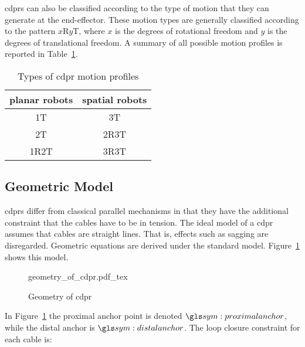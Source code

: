 		\glspl{cdpr} can also be classified according to the type of motion that
		they can generate at the end-effector.	These motion types are generally
		classified according to the pattern $x$R$y$T, where $x$ is	the  degrees
        of rotational freedom and $y$ is the degrees of translational freedom. A
		summary   of   all	 possible	motion	 profiles	is	  reported	  in
        Table~\ref{tab:types_of_cdpr_motion_profiles}.

        \begin{table}[ht]
            \centering
            \begin{tabular}{c c}
                \toprule
                planar robots & spatial robots \\
                \midrule
                1T          &   3T \\
                2T          &   2R3T \\
                1R2T        &   3R3T
            \end{tabular}
            \caption{Types of \gls{cdpr} motion profiles}%
            \label{tab:types_of_cdpr_motion_profiles}
        \end{table}

    \subsection{Geometric Model}%
    \label{sec:geometric_model}

		\glspl{cdpr} differ from classical parallel mechanisms in that they have
		the additional constraint that the cables have to be  in  tension.	 The
        ideal model of a \gls{cdpr} assumes that cables are straight lines. That
		is, effects such as sagging are disregarded.   Geometric  equations  are
		derived under  the	standard  model.   Figure~\ref{fig:geometry_of_cdpr}
        shows this model.  

        \begin{figure}[hb]
			\centering
			\def\svgwidth{\columnwidth}
			{geometry_of_cdpr.pdf_tex}
            \caption{Geometry of \gls{cdpr}}%
            \label{fig:geometry_of_cdpr}
        \end{figure}

		In	Figure~\ref{fig:geometry_of_cdpr}  the	proximal  anchor  point   is
		denoted $\proximalanchor$, while the distal anchor	is	$\distalanchor$.
        The loop closure constraint for each cable is:

